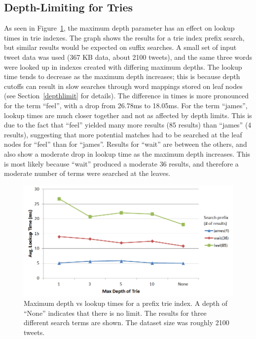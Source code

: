 \documentclass{vldb}
\begin{document}
\subsection{Depth-Limiting for Tries}
As seen in Figure~\ref{comptrie}, the maximum depth parameter has an effect on lookup times in trie indexes. The graph shows the results for a trie index prefix search, but similar results would be expected on suffix searches. A small set of input tweet data was used (367 KB data, about 2100 tweets), and the same three words were looked up in indexes created with differing maximum depths. The lookup time tends to decrease as the maximum depth increases; this is because depth cutoffs can result in slow searches through word mappings stored on leaf nodes (see Section~\ref{depthlimit} for details). The difference in times is more pronounced for the term ``feel'', with a drop from 26.78ms to 18.05ms. For the term ``james'', lookup times are much closer together and not as affected by depth limits. This is due to the fact that ``feel'' yielded many more results (85 results) than ``james'' (4 results), suggesting that more potential matches had to be searched at the leaf nodes for ``feel'' than for ``james''. Results for ``wait'' are between the others, and also show a moderate drop in lookup time as the maximum depth increases. This is most likely because ``wait'' produced a moderate 36 results, and therefore a moderate number of terms were searched at the leaves.

\begin{figure}[h!]
   \includegraphics[scale=.38]{trie_maxdepth_graph}
  \caption{Maximum depth vs lookup times for a prefix trie index. A depth of ``None'' indicates that there is no limit. The results for three different search terms are shown. The dataset size was roughly 2100 tweets.}
\label{comptrie}
\end{figure}
\end{document}
